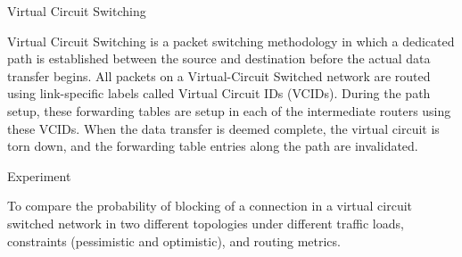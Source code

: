 
\begin{section}{Virtual Circuit Switching}

Virtual Circuit Switching is a packet switching methodology in which a dedicated path is established between the source and destination before the actual data transfer begins. All packets on a Virtual-Circuit Switched network are routed using link-specific labels called Virtual Circuit IDs (VCIDs). During the path setup, these forwarding tables are setup in each of the intermediate routers using these VCIDs. When the data transfer is deemed complete, the virtual circuit is torn down, and the forwarding table entries along the path are invalidated.

\end{section}


\begin{section}{Experiment}

    To compare the probability of blocking of a connection in a virtual circuit switched network in two different topologies under different traffic loads, constraints (pessimistic and optimistic), and routing metrics.

\end{section}

